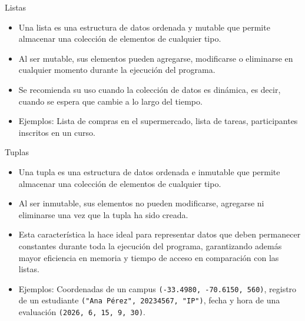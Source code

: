 \documentclass{beamer}
\begin{document}
    \begin{frame}{Listas}
        \begin{itemize}
            \item Una lista es una estructura de datos ordenada y mutable que permite almacenar una colección de elementos de cualquier tipo.
            \item Al ser mutable, sus elementos pueden agregarse, modificarse o eliminarse en cualquier momento durante la ejecución del programa.
            \item Se recomienda su uso cuando la colección de datos es dinámica, es decir, cuando se espera que cambie a lo largo del tiempo.
            \item Ejemplos: Lista de compras en el supermercado, lista de tareas, participantes inscritos en un curso.
        \end{itemize}
    \end{frame}

    \begin{frame}{Tuplas}
        \begin{itemize}
            \item Una tupla es una estructura de datos ordenada e inmutable que permite almacenar una colección de elementos de cualquier tipo.
            \item Al ser inmutable, sus elementos no pueden modificarse, agregarse ni eliminarse una vez que la tupla ha sido creada.
            \item Esta característica la hace ideal para representar datos que deben permanecer constantes durante toda la ejecución del programa, garantizando además mayor eficiencia en memoria y tiempo de acceso en comparación con las listas.
            \item Ejemplos: Coordenadas de un campus \texttt{(-33.4980, -70.6150, 560)}, registro de un estudiante \texttt{("Ana Pérez", 20234567, "IP")}, fecha y hora de una evaluación \texttt{(2026, 6, 15, 9, 30)}.
        \end{itemize}
    \end{frame}
\end{document}
